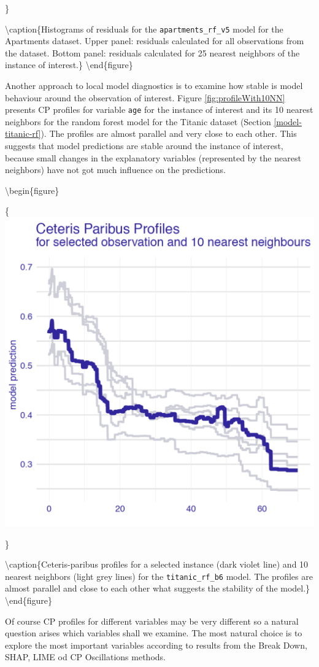 \documentclass[12pt,]{krantz}
\begin{document}
\}

\textbackslash{}caption\{Histograms of residuals for the \texttt{apartments\_rf\_v5} model for the Apartments dataset. Upper panel: residuals calculated for all observations from the dataset. Bottom panel: residuals calculated for 25 nearest neighbors of the instance of interest.\}\label{fig:profileBack2BackHist}
\textbackslash{}end\{figure\}

Another approach to local model diagnostics is to examine how stable is model behaviour around the observation of interest.
Figure \ref{fig:profileWith10NN} presents CP profiles for variable \texttt{age} for the instance of interest and its 10 nearest neighbors for the random forest model for the Titanic dataset (Section \ref{model-titanic-rf}). The profiles are almost parallel and very close to each other. This suggests that model predictions are stable around the instance of interest, because small changes in the explanatory variables (represented by the nearest neighbors) have not got much influence on the predictions.

\textbackslash{}begin\{figure\}

\{\centering \includegraphics[width=0.5\linewidth]{figure/example_cp}

\}

\textbackslash{}caption\{Ceteris-paribus profiles for a selected instance (dark violet line) and 10 nearest neighbors (light grey lines) for the \texttt{titanic\_rf\_b6} model. The profiles are almost parallel and close to each other what suggests the stability of the model.\}\label{fig:profileWith10NN}
\textbackslash{}end\{figure\}

Of course CP profiles for different variables may be very different so a natural question arises which variables shall we examine. The most natural choice is to explore the most important variables according to results from the Break Down, SHAP, LIME od CP Oscillations methods.
\end{document}
